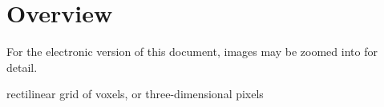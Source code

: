 \chapter{Overview}
%
For the electronic version of this document, images may be zoomed into for detail.

rectilinear grid of voxels, or three-dimensional pixels